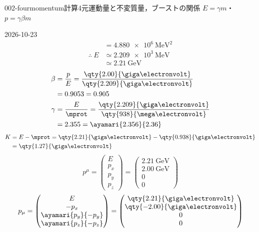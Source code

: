 \documentclass[uplatex,dvipdfmx,a4paper,11pt]{jsarticle}
\begin{document}
\begin{mondai}{002-fourmomentum}{計算}{4元運動量と不変質量，ブーストの関係 $E=\gamma m$・$p=\gamma\beta m$}
\begin{kotaeutsushi}{2026-10-23}
\begin{align*}
  &=\qty{4.880e6}{\mega\electronvolt\squared}\\
  \therefore\ E&\simeq\qty{2.209e3}{\mega\electronvolt}\\
  &\simeq\qty{2.21}{\giga\electronvolt}
\end{align*}
\begin{align*}
  \beta&=\frac{p}{E}=\frac{\qty{2.00}{\giga\electronvolt}}{\qty{2.209}{\giga\electronvolt}}\\
  &=0.9053=0.905\\
  \gamma&=\frac{E}{\mprot}=\frac{\qty{2.209}{\giga\electronvolt}}{\qty{938}{\mega\electronvolt}}\\
  &=2.355=\ayamari{2.356}{2.36}
\end{align*}
\begin{align*}
  K&=E-\mprot=\qty{2.21}{\giga\electronvolt}-\qty{0.938}{\giga\electronvolt}\\
  &=\qty{1.27}{\giga\electronvolt}
\end{align*}
\[ p^{\mu}=\begin{pmatrix}E\\ p_{x}\\ p_{y}\\ p_{z}\end{pmatrix}=\begin{pmatrix}\qty{2.21}{\giga\electronvolt}\\ \qty{2.00}{\giga\electronvolt}\\ 0\\ 0\end{pmatrix} \]
\[ p_{\mu}=\begin{pmatrix}E\\ -p_{x}\\ \ayamari{p_{y}}{-p_{y}}\\ \ayamari{p_{z}}{-p_{z}}\end{pmatrix}=\begin{pmatrix}\qty{2.21}{\giga\electronvolt}\\ \qty{-2.00}{\giga\electronvolt}\\ 0\\ 0\end{pmatrix} \]
\begin{align*}

\end{align*}
\end{kotaeutsushi}
\end{mondai}
\end{document}

